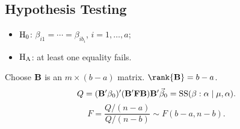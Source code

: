 \subsection*{Hypothesis Testing}
\begin{itemize}
    \item $ \text{H}_0 $: $ \beta_{i1}=\cdots=\beta_{ib_i} $, $ i=1,\ldots,a $;
    \item $ \text{H}_{\text{A}} $: at least one equality fails.
\end{itemize}
Choose
$ \mathbf{B} $ is an $ m\times(b-a) $ matrix. $ \rank{\Matrix{B}}=b-a $.
\[ Q=(\mathbf{B}'\beta_0)'(\mathbf{B}'\mathbf{F}\mathbf{B})\mathbf{B}'\vec{\beta}_0=\text{SS}(\beta:\alpha\mid \mu,\alpha).  \]
\[ F=\frac{Q/(n-a)}{Q/(n-b)} \sim F(b-a,n-b). \]